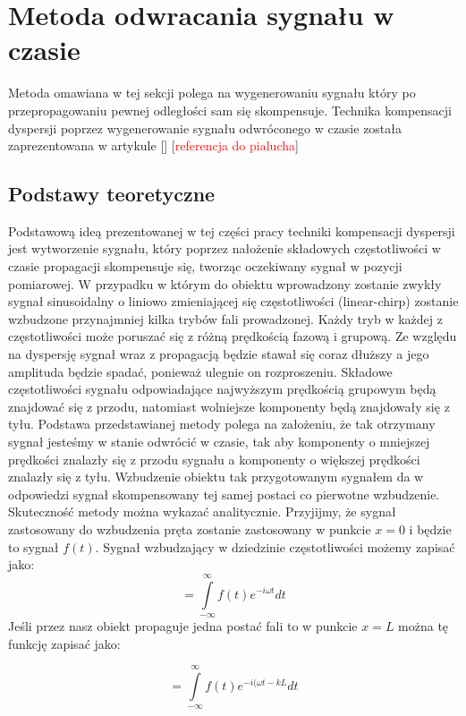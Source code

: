 \section{Metoda odwracania sygnału w czasie}
\label{sec:metoda_tr}

Metoda omawiana w tej sekcji polega na wygenerowaniu sygnału który po przepropagowaniu pewnej odległości sam się skompensuje. Technika kompensacji dyspersji poprzez wygenerowanie sygnału odwróconego w czasie została zaprezentowana w artykule [] [\textcolor{red}{referencja do pialucha}]

\subsection{Podstawy teoretyczne}
Podstawową ideą prezentowanej w tej części pracy techniki kompensacji dyspersji jest wytworzenie sygnału, który poprzez nałożenie składowych częstotliwości w czasie propagacji skompensuje się, tworząc oczekiwany sygnał w pozycji pomiarowej. W przypadku w którym do obiektu wprowadzony zostanie zwykły sygnał sinusoidalny o liniowo zmieniającej się częstotliwości (linear-chirp) zostanie wzbudzone przynajmniej kilka trybów fali prowadzonej. Każdy tryb w każdej z częstotliwości może poruszać się z różną prędkością fazową i grupową. Ze względu na dyspersję sygnał wraz z propagacją będzie stawał się coraz dłuższy a jego amplituda będzie spadać, ponieważ ulegnie on rozproszeniu.  Składowe częstotliwości sygnału odpowiadające najwyższym prędkością grupowym będą znajdować się z przodu, natomiast wolniejsze komponenty będą znajdowały się z tyłu. Podstawa przedstawianej metody polega na założeniu, że tak otrzymany sygnał jesteśmy w stanie odwrócić w czasie, tak aby komponenty o mniejszej prędkości znalazły się z przodu sygnału a komponenty o większej prędkości znalazły się z tyłu. Wzbudzenie obiektu tak przygotowanym sygnałem da w odpowiedzi sygnał skompensowany tej samej postaci co pierwotne wzbudzenie. Skuteczność metody można wykazać analitycznie. Przyjijmy, że sygnał zastosowany do wzbudzenia pręta zostanie zastosowany w punkcie $x = 0$ i będzie to sygnał $f(t)$. Sygnał wzbudzający w dziedzinie częstotliwości możemy zapisać jako:
\begin{equation}
[F(\omega)_{x=0}]=\int\limits_{-\infty}^{\infty}f(t)e^{-i\omega t}dt \label{eq:F(omega)_x=0}
\end{equation}
Jeśli przez nasz obiekt propaguje jedna postać fali to w punkcie $x=L$ można tę funkcję zapisać jako:

\begin{equation}
[F(\omega)_{x=L}]=\int\limits_{-\infty}^{\infty}f(t)e^{-i(\omega t - kL}dt \label{eq:F(omega)_x=L}
\end{equation}

